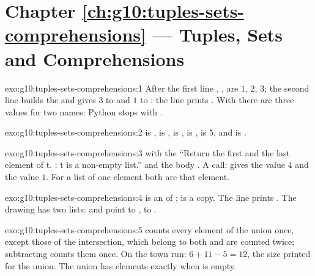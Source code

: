 \section*{Chapter \ref{ch:g10:tuples-sets-comprehensions} --- Tuples, Sets and Comprehensions}

\begin{solution}{exo:g10:tuples-sets-comprehensions:1}
After the first line , ,  are $1$, $2$, $3$; the second line builds the  
and gives $3$ to  and $1$ to : the line prints . With  there are
three values for two names: Python stops with .
\end{solution}

\begin{solution}{exo:g10:tuples-sets-comprehensions:2}
 is ,  is ,  is ,
 is ,  is $5$, and  is .
\end{solution}

\begin{solution}{exo:g10:tuples-sets-comprehensions:3}
 with the  ``Return the first and the last element of t. : t is a
non-empty list.'' and the body . A call:  gives
 the value $4$ and  the value $1$. For a list of one element both are that element.
\end{solution}

\begin{solution}{exo:g10:tuples-sets-comprehensions:4}
 is an  of ;  is a copy. The line prints
. The drawing has two lists:  and  point to
\code{[1, 2, 3]},  to \code{[1, 2, 4]}.
\end{solution}

\begin{solution}{exo:g10:tuples-sets-comprehensions:5}
 counts every element of the union once, except those of the intersection, which belong to
both  and are counted twice; subtracting  counts them once. On the town run: $6 + 11 - 5 = 12$,
the size printed for the union. The union has  elements exactly when  is empty.
\end{solution}

